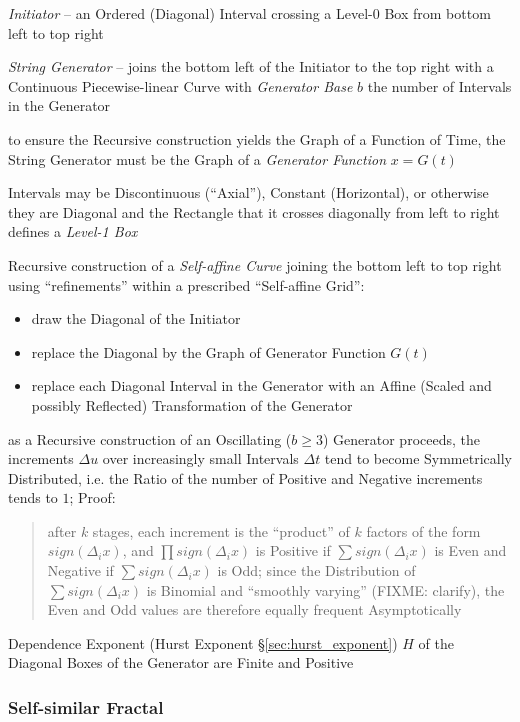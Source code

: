 \emph{Initiator} -- an Ordered (Diagonal) Interval crossing a Level-0 Box
from bottom left to top right

\emph{String Generator} -- joins the bottom left of the Initiator to the top
right with a Continuous Piecewise-linear Curve with \emph{Generator Base} $b$
the number of Intervals in the Generator

to ensure the Recursive construction yields the Graph of a Function of Time, the
String Generator must be the Graph of a \emph{Generator Function} $x = G(t)$

Intervals may be Discontinuous (``Axial''), Constant (Horizontal), or otherwise
they are Diagonal and the Rectangle that it crosses diagonally from left to
right defines a \emph{Level-1 Box}

Recursive construction of a \emph{Self-affine Curve} joining the bottom left to
top right using ``refinements'' within a prescribed ``Self-affine Grid'':
\begin{itemize}
  \item draw the Diagonal of the Initiator
  \item replace the Diagonal by the Graph of Generator Function $G(t)$
  \item replace each Diagonal Interval in the Generator with an Affine (Scaled
    and possibly Reflected) Transformation of the Generator
\end{itemize}

as a Recursive construction of an Oscillating ($b \geq 3$) Generator proceeds,
the increments $\Delta u$ over increasingly small Intervals $\Delta t$ tend to
become Symmetrically Distributed, i.e. the Ratio of the number of Positive and
Negative increments tends to $1$; Proof:
\begin{quote}
  after $k$ stages, each increment is the ``product'' of $k$ factors of the form
  $sign(\Delta_i x)$, and $\prod sign(\Delta_i x)$ is Positive if
  $\sum sign(\Delta_i x)$ is Even and Negative if $\sum sign(\Delta_i x)$ is
  Odd; since the Distribution of $\sum sign(\Delta_i x)$ is Binomial and
  ``smoothly varying'' (FIXME: clarify), the Even and Odd values are therefore
  equally frequent Asymptotically
\end{quote}

Dependence Exponent (Hurst Exponent \S\ref{sec:hurst_exponent}) $H$ of the
Diagonal Boxes of the Generator are Finite and Positive



\subsubsection{Self-similar Fractal}\label{sec:selfsimilar_fractal}


